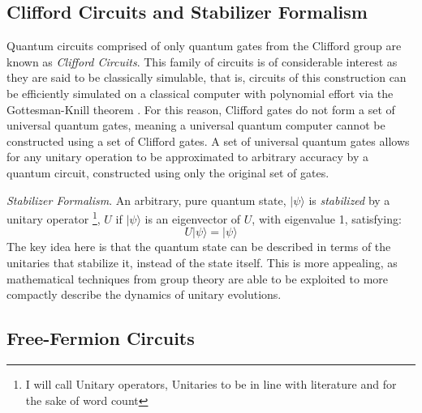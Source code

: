 \subsection{Clifford Circuits and Stabilizer Formalism}

Quantum circuits comprised of only quantum gates from the Clifford group are known as \textit{Clifford Circuits}.
This family of circuits is of considerable interest as they are said to be classically simulable, that is,
circuits of this construction can be efficiently simulated on a classical computer with polynomial
effort via the Gottesman-Knill theorem \cite{knillGottesman}. For this reason, Clifford gates do not form
a set of universal quantum gates, meaning a universal quantum computer cannot be constructed using a set
of Clifford gates. A set of universal quantum gates allows for any unitary operation to be approximated to
arbitrary accuracy by a quantum circuit, constructed using only the original set of gates.

\textit{Stabilizer Formalism}. An arbitrary, pure quantum state, $|\psi\rangle$ is \textit{stabilized} by
a unitary operator \footnote{I will call Unitary operators, Unitaries to be in line with literature and for the sake of word count},
$U$ if $|\psi\rangle$  is an eigenvector of $U$, with eigenvalue 1, satisfying:
\begin{equation}
    U|\psi\rangle = |\psi\rangle
\end{equation}
The key idea here is that the quantum state can be described in terms of the unitaries that stabilize it, instead of the state itself.
This is more appealing, as mathematical techniques from group theory are able to be exploited to more
compactly describe the dynamics of unitary evolutions.

\subsection{Free-Fermion Circuits}











